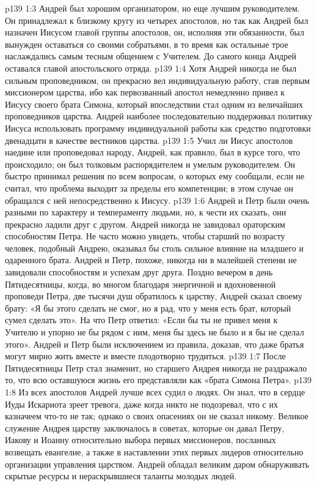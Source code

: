 \vs p139 1:3 \pc Андрей был хорошим организатором, но еще лучшим руководителем. Он принадлежал к близкому кругу из четырех апостолов, но так как Андрей был назначен Иисусом главой группы апостолов, он, исполняя эти обязанности, был вынужден оставаться со своими собратьями, в то время как остальные трое наслаждались самым тесным общением с Учителем. До самого конца Андрей оставался главой апостольского отряда.
\vs p139 1:4 Хотя Андрей никогда не был сильным проповедником, он прекрасно вел индивидуальную работу, став первым миссионером царства, ибо как первозванный апостол немедленно привел к Иисусу своего брата Симона, который впоследствии стал одним из величайших проповедников царства. Андрей наиболее последовательно поддерживал политику Иисуса использовать программу индивидуальной работы как средство подготовки двенадцати в качестве вестников царства.
\vs p139 1:5 Учил ли Иисус апостолов наедине или проповедовал народу, Андрей, как правило, был в курсе того, что происходило; он был толковым распорядителем и умелым руководителем. Он быстро принимал решения по всем вопросам, о которых ему сообщали, если не считал, что проблема выходит за пределы его компетенции; в этом случае он обращался с ней непосредственно к Иисусу.
\vs p139 1:6 \pc Андрей и Петр были очень разными по характеру и темпераменту людьми, но, к чести их сказать, они прекрасно ладили друг с другом. Андрей никогда не завидовал ораторским способностям Петра. Не часто можно увидеть, чтобы старший по возрасту человек, подобный Андрею, оказывал бы столь сильное влияние на младшего и одаренного брата. Андрей и Петр, похоже, никогда ни в малейшей степени не завидовали способностям и успехам друг друга. Поздно вечером в день Пятидесятницы, когда, во многом благодаря энергичной и вдохновенной проповеди Петра, две тысячи душ обратилось к царству, Андрей сказал своему брату: «Я бы этого сделать не смог, но я рад, что у меня есть брат, который сумел сделать это». На что Петр ответил: «Если бы ты не привел меня к Учителю и упорно не  бы рядом с ним, меня бы здесь не было и я бы не сделал этого». Андрей и Петр были исключением из правила, доказав, что даже братья могут мирно жить вместе и вместе плодотворно трудиться.
\vs p139 1:7 После Пятидесятницы Петр стал знаменит, но старшего Андрея никогда не раздражало то, что всю оставшуюся жизнь его представляли как «брата Симона Петра».
\vs p139 1:8 \pc Из всех апостолов Андрей лучше всех судил о людях. Он знал, что в сердце Иуды Искариота зреет тревога, даже когда никто не подозревал, что с их казначеем что\hyp{}то не так; однако о своих опасениях он не сказал никому. Великое служение Андрея царству заключалось в советах, которые он давал Петру, Иакову и Иоанну относительно выбора первых миссионеров, посланных возвещать евангелие, а также в наставлении этих первых лидеров относительно организации управления царством. Андрей обладал великим даром обнаруживать скрытые ресурсы и нераскрывшиеся таланты молодых людей.
